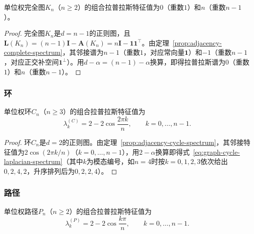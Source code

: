 \begin{theorem}[完全图的拉普拉斯谱]
\label{prop:graph-typical-laplacian-spectra}
单位权完全图$K_n$（$n\geq 2$）的组合拉普拉斯特征值为$0$（重数$1$）和$n$（重数$n-1$）。
\end{theorem}

\begin{proof}
完全图$K_n$是$d=n-1$的正则图，且$\bm L(K_n)=(n-1)\bm I-\bm A(K_n)=n\bm I-\bm 1\bm 1^\top$。由定理~\ref{prop:adjacency-complete-spectrum}，其邻接谱为$n-1$（重数$1$，对应常向量$\bm 1$）和$-1$（重数$n-1$，对应正交补空间$\bm 1^\perp$）。用$d-\alpha=(n-1)-\alpha$换算，即得拉普拉斯谱为$0$（重数$1$）和$n$（重数$n-1$）。
\end{proof}

\subsubsection{环}
\label{sec:graph-cycle-laplacian-spectrum}

\begin{theorem}[环的拉普拉斯谱]
\label{thm:graph-cycle-laplacian-spectra}
单位权环$C_n$（$n\geq 3$）的组合拉普拉斯特征值为
\begin{equation}
  \lambda_k^{(C)}=2-2\cos\frac{2\pi k}{n},\qquad k=0,\ldots,n-1.
  \label{eq:graph-cycle-laplacian-spectrum}
\end{equation}
\end{theorem}

\begin{proof}
环$C_n$是$d=2$的正则图。由定理~\ref{prop:adjacency-cycle-spectrum}，其邻接特征值为$2\cos(2\pi k/n)$（$k=0,\ldots,n-1$），用$2-\alpha$换算即得式~\eqref{eq:graph-cycle-laplacian-spectrum}（其中$k$为模态编号，如$n=4$时按$k=0,1,2,3$依次给出$0,2,4,2$，升序排列后为$0,2,2,4$）。
\end{proof}

\subsubsection{路径}
\label{sec:graph-cycle-path-laplacian-spectrum}

\begin{theorem}[路径的拉普拉斯谱]
\label{thm:graph-path-laplacian-spectra}
单位权路径$P_n$（$n\geq 2$）的组合拉普拉斯特征值为
\begin{equation}
  \lambda_k^{(P)}=2-2\cos\frac{k\pi}{n},\qquad k=0,\ldots,n-1.
  \label{eq:graph-path-laplacian-spectrum}
\end{equation}
\end{theorem}

